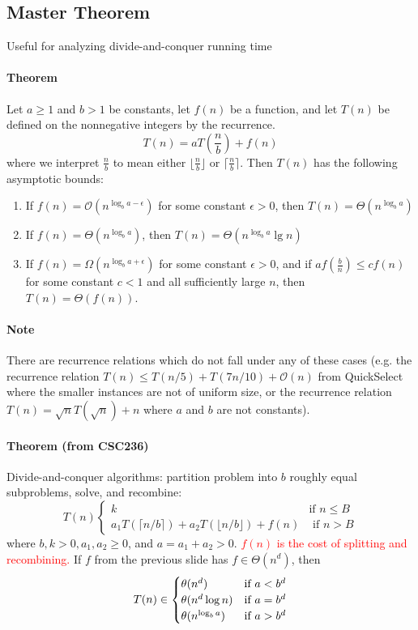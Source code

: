 \documentclass[11pt]{article}
\begin{document}
\subsection{Master Theorem}
Useful for analyzing divide-and-conquer running time
\paragraph{Theorem}
Let $a \geq 1$ and $b > 1$ be constants, let $f(n)$ be a function, and let $	T(n)$ be defined on the nonnegative integers by the recurrence.
$$T(n) = aT(\frac{n}{b}) + f(n)$$
where we interpret $\frac{n}{b}$ to mean either $\lfloor \frac{n}{b} \rfloor$ or $\lceil \frac{n}{b} \rceil$. Then $T(n)$ has the following asymptotic bounds:
\begin{enumerate}
	\item If $f(n) = \mathcal{O}(n^{\log_b{a-\epsilon}})$ for some constant $\epsilon > 0$, then $T(n) = \Theta(n^{\log_b a})$
	\item If $f(n) = \Theta(n^{\log_b a})$, then $T(n) = \Theta(n^{\log_b a} \lg n)$
	\item If $f(n) = \Omega(n^{\log_b{a+\epsilon}})$ for some constant $\epsilon > 0$, and if $af(\frac{b}{n}) \leq cf(n)$ for some constant $c < 1$ and all sufficiently large $n$, then $T(n) = \Theta(f(n))$.	
\end{enumerate}

\paragraph{Note}
There are recurrence relations which do not fall under any of these cases (e.g. the recurrence relation $T(n) \leq T(n/5) + T(7n/10) + \mathcal{O}(n)$ from QuickSelect where the smaller instances are not of uniform size, or the recurrence relation $T(n) = \sqrt{n}T(\sqrt{n}) + n$ where $a$ and $b$ are not constants).

\paragraph{Theorem (from CSC236)}
Divide-and-conquer algorithms: partition problem into $b$ roughly equal subproblems, solve, and recombine:
$$T(n) \begin{cases}
	k & \text{if $n \leq B$} \\
a_1T(\lceil n / b \rceil) + a_2T(\lfloor n/b \rfloor) + f(n) & \text{ if $n > B$}
\end{cases}$$
where $b, k >0, a_1, a_2 \geq 0$, and $a = a_1 + a_2 > 0$. \textcolor{red}{$f(n)$ is the cost of splitting and recombining.} If $f$ from the previous slide has $f \in \Theta(n^d)$, then
$$T(n) \in \begin{cases}
	\theta(n^d) & \text{if $ a < b^d$} \\
	\theta(n^d\log n) & \text{if $a = b^d$} \\
	\theta(n^{\log_b a}) & \text{if $a > b^d$}
\end{cases}
$$
\end{document}
